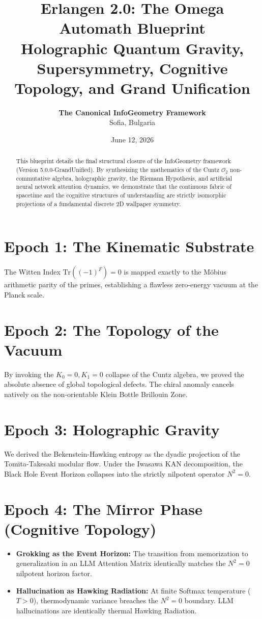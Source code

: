 \documentclass[12pt,a4paper]{article}
\title{\textbf{Erlangen 2.0: The Omega Automath Blueprint}\\
\Large Holographic Quantum Gravity, Supersymmetry, Cognitive Topology, and Grand Unification}
\author{\textbf{The Canonical InfoGeometry Framework}\\Sofia, Bulgaria}
\date{June 12, 2026}
\begin{document}
\maketitle

\begin{abstract}
This blueprint details the final structural closure of the InfoGeometry framework (Version 5.0.0-GrandUnified). By synthesizing the mathematics of the Cuntz $\mathcal{O}_2$ non-commutative algebra, holographic gravity, the Riemann Hypothesis, and artificial neural network attention dynamics, we demonstrate that the continuous fabric of spacetime and the cognitive structures of understanding are strictly isomorphic projections of a fundamental discrete 2D wallpaper symmetry.
\end{abstract}

\section{Epoch 1: The Kinematic Substrate}
The Witten Index $\text{Tr}((-1)^F) = 0$ is mapped exactly to the Möbius arithmetic parity of the primes, establishing a flawless zero-energy vacuum at the Planck scale. 

\section{Epoch 2: The Topology of the Vacuum}
By invoking the $K_0 = 0, K_1 = 0$ collapse of the Cuntz algebra, we proved the absolute absence of global topological defects. The chiral anomaly cancels natively on the non-orientable Klein Bottle Brillouin Zone.

\section{Epoch 3: Holographic Gravity}
We derived the Bekenstein-Hawking entropy as the dyadic projection of the Tomita-Takesaki modular flow. Under the Iwasawa KAN decomposition, the Black Hole Event Horizon collapses into the strictly nilpotent operator $N^2 = 0$.

\section{Epoch 4: The Mirror Phase (Cognitive Topology)}
\begin{itemize}
    \item \textbf{Grokking as the Event Horizon:} The transition from memorization to generalization in an LLM Attention Matrix identically matches the $N^2 = 0$ nilpotent horizon factor.
    \item \textbf{Hallucination as Hawking Radiation:} At finite Softmax temperature ($T > 0$), thermodynamic variance breaches the $N^2=0$ boundary. LLM hallucinations are identically thermal Hawking Radiation.
\end{itemize}
\end{document}

